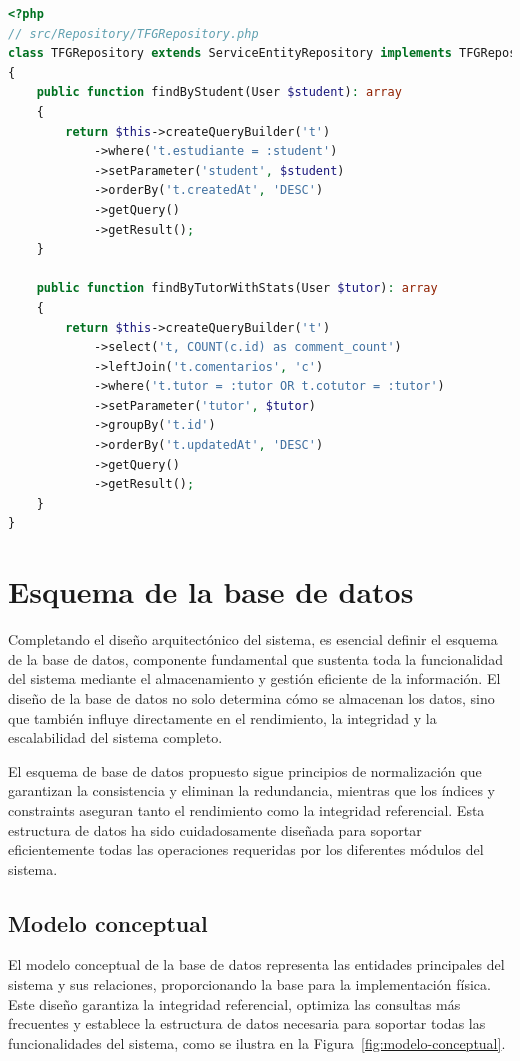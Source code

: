 \documentclass[12pt,a4paper,oneside]{report}
\begin{document}
\begin{lstlisting}[language=PHP]
<?php
// src/Repository/TFGRepository.php
class TFGRepository extends ServiceEntityRepository implements TFGRepositoryInterface
{
    public function findByStudent(User $student): array
    {
        return $this->createQueryBuilder('t')
            ->where('t.estudiante = :student')
            ->setParameter('student', $student)
            ->orderBy('t.createdAt', 'DESC')
            ->getQuery()
            ->getResult();
    }
    
    public function findByTutorWithStats(User $tutor): array
    {
        return $this->createQueryBuilder('t')
            ->select('t, COUNT(c.id) as comment_count')
            ->leftJoin('t.comentarios', 'c')
            ->where('t.tutor = :tutor OR t.cotutor = :tutor')
            ->setParameter('tutor', $tutor)
            ->groupBy('t.id')
            ->orderBy('t.updatedAt', 'DESC')
            ->getQuery()
            ->getResult();
    }
}
\end{lstlisting}

\section{Esquema de la base de datos}\label{esquema-de-la-base-de-datos}

Completando el diseño arquitectónico del sistema, es esencial definir el
esquema de la base de datos, componente fundamental que sustenta toda la
funcionalidad del sistema mediante el almacenamiento y gestión eficiente
de la información. El diseño de la base de datos no solo determina cómo
se almacenan los datos, sino que también influye directamente en el
rendimiento, la integridad y la escalabilidad del sistema completo.

El esquema de base de datos propuesto sigue principios de normalización
que garantizan la consistencia y eliminan la redundancia, mientras que
los índices y constraints aseguran tanto el rendimiento como la
integridad referencial. Esta estructura de datos ha sido cuidadosamente
diseñada para soportar eficientemente todas las operaciones requeridas
por los diferentes módulos del sistema.

\subsection{Modelo conceptual}\label{modelo-conceptual}

El modelo conceptual de la base de datos representa las entidades principales del sistema y sus relaciones, proporcionando la base para la implementación física. Este diseño garantiza la integridad referencial, optimiza las consultas más frecuentes y establece la estructura de datos necesaria para soportar todas las funcionalidades del sistema, como se ilustra en la Figura~\ref{fig:modelo-conceptual}.
\end{document}
